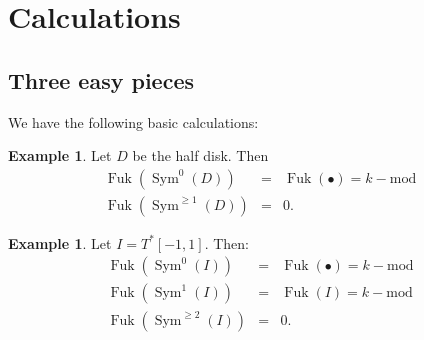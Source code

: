 \documentclass{article}
\DeclareMathOperator{\Sym}{Sym}
\DeclareMathOperator{\Fuk}{Fuk}
\theoremstyle{definition}
\newtheorem{example}[theorem]{Example}
\begin{document}
\section{Calculations}

\subsection{Three easy pieces}

We have the following basic calculations:    

\begin{example}
    Let $D$ be the half disk.  Then
     \begin{eqnarray*}
        \Fuk(\Sym^0(D)) & = & \Fuk(\bullet) = k-\mathrm{mod} \\
        \Fuk(\Sym^{\ge 1}(D)) & = & 0.
    \end{eqnarray*}
\end{example}

\begin{example}
    Let $I = T^*[-1,1]$.  Then:    
    \begin{eqnarray*}
        \Fuk(\Sym^0(I)) & = & \Fuk(\bullet) = k-\mathrm{mod} \\
        \Fuk(\Sym^1(I)) & = & \Fuk(I) = k-\mathrm{mod} \\
        \Fuk(\Sym^{\ge 2}(I)) & = & 0.
    \end{eqnarray*}
\end{example}
\end{document}
